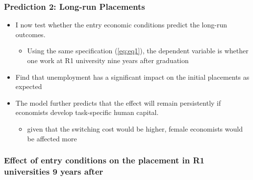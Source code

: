 \documentclass[11pt]{beamer}
\begin{document}
\begin{frame}
	\frametitle{Prediction 2: Long-run Placements}
	\begin{itemize}
		\item I now test whether the entry economic conditions predict the long-run outcomes.
		\begin{itemize}
			\item Using the same specification (\ref{eq:eq1}), the dependent variable is whether one work at R1 university nine years after graduation
		\end{itemize}
		\item Find that unemployment has a significant impact on the initial placements as expected
		\item The model further predicts that the effect will remain persistently if economists develop task-specific human capital.
		\begin{itemize}
			\item given that the switching cost would be higher, female economists would be affected more 
		\end{itemize}
	\end{itemize}
\end{frame}


{
	\begin{frame}
		\frametitle{Effect of entry conditions on the placement in R1 universities 9 years after}
		
	\end{frame}
}
\end{document}

